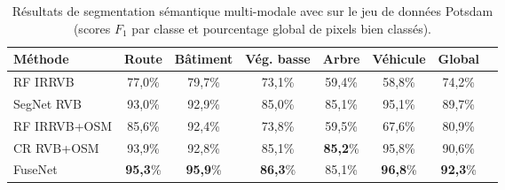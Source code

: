 \begin{table}[t]
	\caption{Résultats de segmentation sémantique multi-modale avec  sur le jeu de données  Potsdam (scores $F_1$ par classe et pourcentage global de pixels bien classés).}
    \label{table_potsdam_results}
	\begin{tabularx}{\textwidth}{Y c c c c c c c}
    \toprule
    Méthode                 & Route     & Bâtiment& Vég. basse  & Arbre   & Véhicule & Global\\
    \midrule
    RF \gls{IRRVB}          & 77,0\%    & 79,7\%  & 73,1\%      & 59,4\%  & 58,8\%   & 74,2\%\\
    SegNet \gls{RVB}        & 93,0\%    &	92,9\%	&	85,0\%      &	85,1\%  &	95,1\%	 & 89,7\%\\
    \midrule
    RF \gls{IRRVB}+\gls{OSM}& 85,6\%    & 92,4\%  & 73,8\%      & 59,5\%  & 67,6\%   & 80,9\%\\
    CR \gls{RVB}+\gls{OSM}  &	93,9\%    &	92,8\%	&	85,1\%		  &	\textbf{85,2}\%    &	95,8\%	&	90,6\%\\
    FuseNet                 &	\textbf{95,3}\%	&	\textbf{95,9}\%	&	\textbf{86,3}\%	   &	85,1\%	&	\textbf{96,8}\%	&	\textbf{92,3}\%\\
    \bottomrule
    \end{tabularx}
\end{table}


